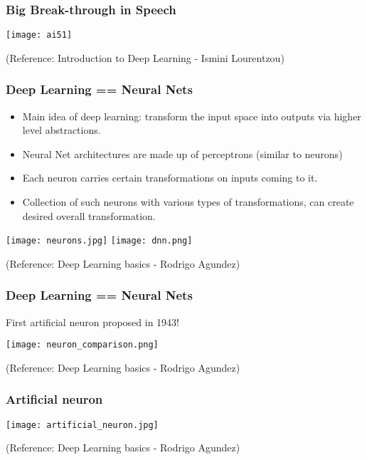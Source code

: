 \begin{frame}[fragile] \frametitle{Big Break-through in Speech}
\begin{center}
\texttt{[image: ai51]}
\end{center}
\tiny{(Reference: Introduction to Deep Learning - Ismini Lourentzou)}
\end{frame}

\begin{frame}[fragile] \frametitle{Deep Learning == Neural Nets }

\begin{itemize}
\item Main idea of deep learning: transform the input space into outputs via higher level abstractions.
\item Neural Net architectures are made up of perceptrons (similar to neurons) 
\item Each neuron carries certain transformations on inputs coming to it.
\item Collection of such neurons with various types of transformations, can create desired overall transformation.
\end{itemize}

\begin{center}
\texttt{[image: neurons.jpg]}
\texttt{[image: dnn.png]}
\end{center}

\tiny{(Reference: Deep Learning basics - Rodrigo Agundez)}

\end{frame}

\begin{frame}[fragile] \frametitle{Deep Learning == Neural Nets }
First artificial neuron proposed in 1943!

\begin{center}
\texttt{[image: neuron\_comparison.png]}

\end{center}

\tiny{(Reference: Deep Learning basics - Rodrigo Agundez)}

\end{frame}


\begin{frame}[fragile] \frametitle{Artificial neuron}

\begin{center}
\texttt{[image: artificial\_neuron.jpg]}

\end{center}

\tiny{(Reference: Deep Learning basics - Rodrigo Agundez)}

\end{frame}

